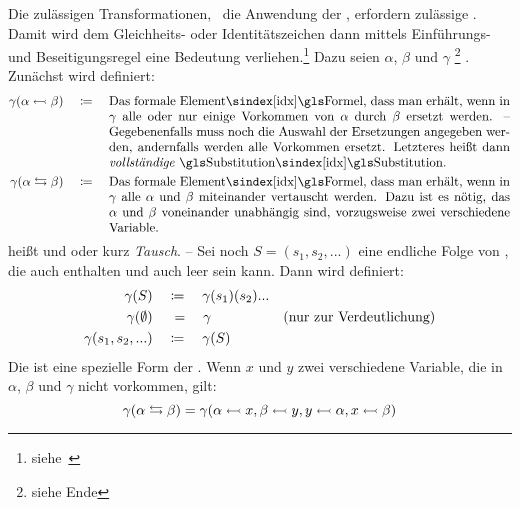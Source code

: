 {Die zulässigen Transformationen, \textdh\ die Anwendung der , erfordern zulässige .
Damit wird dem Gleichheits- oder Identitätszeichen \symqt{\eq} dann mittels Einführungs- und Beseitigungsregel eine Bedeutung verliehen.\footnote{siehe~\cite{bib:NatuerlichesSchliessen}}
Dazu seien $\alpha$, $\beta$ und $\gamma$ %
\footnote{siehe Ende }
.
Zunächst wird definiert:
\begin{align}
	\gamma(\alpha \subst \beta) \quad \defeq \quad
	\parbox[t]{11cm}{%
		Das \glsIdxBg{Formel}{formale Element}, dass man erhält, wenn in $\gamma$ alle oder nur einige Vorkommen von $\alpha$ durch $\beta$ ersetzt werden.
		-- Gegebenenfalls muss noch die Auswahl der Ersetzungen angegeben werden, andernfalls werden alle Vorkommen ersetzt.
		Letzteres heißt dann \emph{vollständige} \glsIdx{Substitution}.
	} \label{def:Substitution}\\
	\gamma(\alpha \swap \beta) \quad \defeq \quad
	\parbox[t]{11cm}{%
		Das \glsIdxBg{Formel}{formale Element}, dass man erhält, wenn in $\gamma$ alle $\alpha$ und $\beta$ miteinander vertauscht werden.
		Dazu ist es nötig, das $\alpha$ und $\beta$ voneinander unabhängig sind, vorzugsweise zwei verschiedene Variable.
	} \label{def:Vertauschung}
\end{align}
\forqt{\alpha \subst \beta} heißt \emph{} und \forqt{\alpha \swap \beta} \emph{} oder kurz \emph{Tausch}.
-- Sei noch $S = (s_1, s_2, ...)$ eine endliche Folge von , die auch  enthalten und auch leer sein kann. Dann wird definiert:
\begin{align}
	\gamma(S) & \quad \coloneqq \quad \gamma(s_1)(s_2)... \label{def:Substitutionen}\\
	\gamma(\emptyset) & \quad \; = \quad \gamma & \text{(nur zur Verdeutlichung)}\\
	\gamma(s_1,s_2,...) & \quad \coloneqq \quad \gamma(S)
\end{align}
%
Die  ist eine spezielle Form der .
Wenn $x$ und $y$ zwei verschiedene Variable, die in $\alpha$, $\beta$ und $\gamma$ nicht vorkommen, gilt:
\[
	\gamma(\alpha \leftrightarrows \beta) = \gamma(\alpha\leftarrowtail x, \beta\leftarrowtail y,  y\leftarrowtail\alpha, x \leftarrowtail\beta)
\]

}

